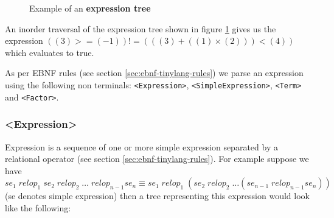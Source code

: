 \begin{figure}[H]
    \centering
    \caption{Example of an \textbf{expression tree}}
    \label{fig:example of an expression tree}
\end{figure}
An inorder traversal of the expression tree shown in figure \ref{fig:example of an expression tree} gives us the expression $((3)>=(-1))!=(((3)+((1)\times(2)))<(4))$ which evaluates to true.

As per EBNF rules (see section \ref{sec:ebnf-tinylang-rules}) we parse an expression using the following non terminals:
\verb!<Expression>!, \verb!<SimpleExpression>!, \verb!<Term>! and \verb!<Factor>!.

\subsubsection{<Expression>}
\label{sec:expression tree}
Expression is a sequence of one or more simple expression separated by a relational operator (see section \ref{sec:ebnf-tinylang-rules}). For example suppose we have $se_1 \; relop_1  \; se_2 \;  relop_2  \; \ldots \; relop_{n-1} se_n \equiv  se_1 \; relop_1  \; (se_2 \;  relop_2  \; \ldots  (se_{n-1}\; relop_{n-1} se_n))$
(se denotes simple expression) then a tree representing this expression would look like the following:

